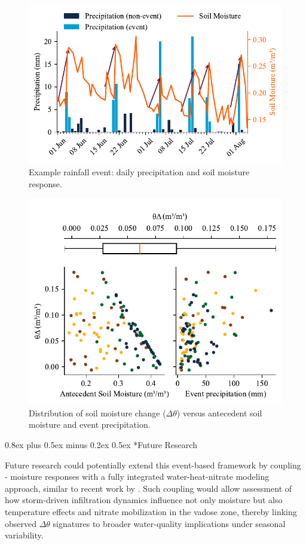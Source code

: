 \documentclass[twocolumn]{article}
\makeatletter
\renewcommand\section{\@startsection{section}{1}{0pt}%
  {0.8ex plus 0.5ex minus 0.2ex}%
  {0.5ex}%
  {\normalfont\large\bfseries}}
\makeatother
\begin{document}
\begin{figure}[!h]
    \centering
    \includegraphics[width=\columnwidth]{sample events}
    \caption{Example rainfall event: daily precipitation and soil moisture response.}
    \label{fig:sample_events}
\end{figure}

\begin{figure}[!h]
    \centering
    \includegraphics[width=\columnwidth]{dt events}
    \caption{Distribution of soil moisture change ($\Delta \theta$) versus antecedent soil moisture and event precipitation.}
    \label{fig:dt_events}
\end{figure}


\section*{Future Research}

Future research could potentially extend this event-based framework by coupling - moisture responses with a fully integrated water-heat-nitrate modeling approach, similar to recent work by \textcite{Fahs2025}. Such coupling would allow assessment of how storm-driven infiltration dynamics influence not only moisture but also temperature effects and nitrate mobilization in the vadose zone, thereby linking observed $\Delta \theta$ signatures to broader water-quality implications under seasonal variability.

\printbibliography
\end{document}
